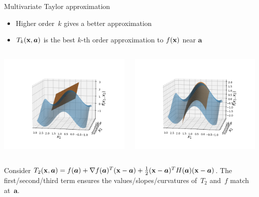 \documentclass[11pt,compress,t,notes=noshow, xcolor=table]{beamer}
\begin{document}
\begin{vbframe}{Multivariate Taylor approximation}

\begin{itemize}
    \item Higher order~$k$ gives a better approximation
    \item $T_k(\mathbf{x},\bm{a})$ is the best $k$-th order approximation to $f(\mathbf{x})$ near $\bm{a}$
\end{itemize}

\begin{columns}
    \begin{column}{0.48\textwidth}
        \includegraphics[width = \textwidth]{figure_man/Taylor2D/Taylor2D_1st100.png}
    \end{column}
    \begin{column}{0.48\textwidth}
        \includegraphics[width = \textwidth]{figure_man/Taylor2D/Taylor2D_2nd-100.png}
    \end{column}
\end{columns}

Consider $T_2(\mathbf{x}, \bm{a}) = f(\bm{a}) + \nabla f(\bm{a})^T (\mathbf{x}-\bm{a}) + \frac{1}{2}(\mathbf{x}-\bm{a})^T H (\bm{a})(\mathbf{x}-\bm{a})$.
The first/second/third term ensures the values/slopes/curvatures of~$T_2$ and~$f$ match at~$\bm{a}$.

\end{vbframe}
\end{document}
